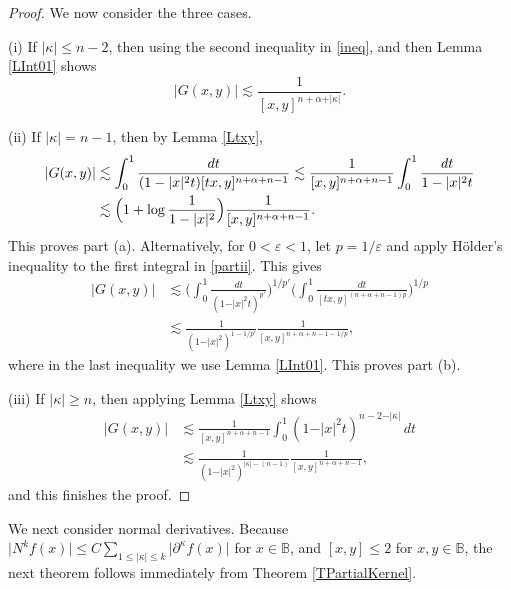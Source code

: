 \documentclass{amsart}
\theoremstyle{definition}
\theoremstyle{remark}
\begin{document}
\begin{proof}
We now consider the three cases.

(i) If $\vert\kappa\vert\le n-2$, then using the second inequality
in \eqref{ineq}, and then Lemma \ref{LInt01} shows
\begin{equation*}
\vert G(x,y)\vert
\lesssim\frac{1}{[x,y]^{n+\alpha+\vert\kappa\vert}}.
\end{equation*}

(ii) If $\vert\kappa\vert=n-1$, then by Lemma \ref{Ltxy},
\begin{align}
\vert G(x,y)\vert
&\lesssim \int_0^1\frac{dt}{(1-\vert x\vert^2 t)[tx,y]^{n+\alpha+n-1}}
\lesssim \frac{1}{[x,y]^{n+\alpha+n-1}}\int_0^1\frac{dt}{1-\vert x\vert^2 t}
\label{partii}\\
&\lesssim \Bigl(1+\log\frac{1}{1-\vert x\vert^2}\Bigr)\frac{1}{[x,y]^{n+\alpha+n-1}}.
\notag
\end{align}
This proves part (a).
Alternatively, for $0<\varepsilon<1$, let $p=1/\varepsilon$ and apply
H\"{o}lder's inequality to the first integral in \eqref{partii}.
This gives
\begin{align*}
\vert G(x,y)\vert
&\lesssim \biggl(\int_0^1\frac{dt}{(1-\vert x\vert^2 t)^{p'}}\biggr)^{1/p'}
\biggl(\int_0^1\frac{dt}{[tx,y]^{(n+\alpha+n-1)p}}\biggr)^{1/p}\\
&\lesssim \frac{1}{(1-\vert x\vert^2)^{1-1/p'}}
\frac{1}{[x,y]^{n+\alpha+n-1-1/p}},
\end{align*}
where in the last inequality we use Lemma \ref{LInt01}.
This proves part (b).

(iii) If $\vert\kappa\vert\ge n$, then applying Lemma \ref{Ltxy} shows
\begin{align*}
\vert G(x,y)\vert
&\lesssim \frac{1}{[x,y]^{n+\alpha+n-1}}
\int_0^1 (1-\vert x\vert^2 t)^{n-2-\vert\kappa\vert}\,dt\\
&\lesssim \frac{1}{(1-\vert x\vert^2)^{\vert\kappa\vert-(n-1)}}
\frac{1}{[x,y]^{n+\alpha+n-1}},
\end{align*}
and this finishes the proof.
\end{proof}

We next consider normal derivatives.
Because $\vert N^k f(x)\vert
\le C\sum_{1\le \vert\kappa\vert\le k}\vert\partial^\kappa f(x)\vert$
for $x\in\mathbb B$, and $[x,y]\le 2$ for $x,y\in\mathbb B$, the
next theorem follows immediately from Theorem \ref{TPartialKernel}.
\end{document}
